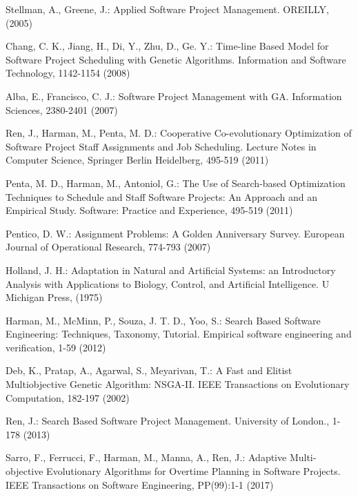 %


\begin{thebibliography}{}
%
Stellman, A., Greene, J.:
Applied Software Project Management.
OREILLY, (2005)

Chang, C. K., Jiang, H., Di, Y., Zhu, D., Ge. Y.:
Time-line Based Model for Software Project Scheduling with Genetic Algorithms.
Information and Software Technology, 1142-1154 (2008)

Alba, E., Francisco, C. J.:
Software Project Management with GA.
Information Sciences, 2380-2401 (2007)

Ren, J., Harman, M., Penta, M. D.:
Cooperative Co-evolutionary Optimization of Software 
Project Staff Assignments and Job Scheduling.
Lecture Notes in Computer Science, Springer Berlin Heidelberg, 495-519 (2011)

Penta, M. D., Harman, M., Antoniol, G.:
The Use of Search-based Optimization Techniques to 
Schedule and Staff Software Projects: An Approach and an Empirical Study. 
Software: Practice and Experience, 495-519 (2011)

Pentico, D. W.:
Assignment Problems: A Golden Anniversary Survey.
European Journal of Operational Research, 774-793 (2007)

Holland, J. H.:
Adaptation in Natural and Artificial Systems: an Introductory 
Analysis with Applications to Biology, Control, and Artificial Intelligence.
U Michigan Press, (1975)

Harman, M., McMinn, P., Souza, J. T. D., Yoo, S.:
Search Based Software Engineering: Techniques, Taxonomy, Tutorial.
Empirical software engineering and verification, 1-59 (2012)

Deb, K., Pratap, A., Agarwal, S., Meyarivan, T.:
A Fast and Elitist Multiobjective Genetic Algorithm: NSGA-II.
IEEE Transactions on Evolutionary Computation, 182-197 (2002)

Ren, J.:
Search Based Software Project Management.
University of London., 1-178 (2013)

Sarro, F., Ferrucci, F., Harman, M., Manna, A., Ren, J.:
Adaptive Multi-objective Evolutionary Algorithms for Overtime Planning in Software Projects.
IEEE Transactions on Software Engineering, PP(99):1-1 (2017)


\end{thebibliography}
